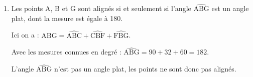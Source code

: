 \documentclass[12pt,a4paper,french]{article}
\begin{document}
\begin{enumerate}
	On peut donc calculer le cosinus de l'angle :\quad $\cos\left(\widehat{\mathrm{FBG}}\right) = \dfrac{\text{côté adjacent}}{\text{hypoténuse}} = \dfrac{\mathrm{BG}}{\mathrm{BF}} = \dfrac{2}{4} = \dfrac{1}{2}$.

	On a donc : \quad $\widehat{\mathrm{FBG}} = \arccos\left(\dfrac{1}{2}\right) = 60\degres$.

	\item Les points A, B et G sont alignés si et seulement si l'angle $\widehat{\mathrm{ABG}}$ est un angle plat, dont la mesure est égale à 180\degres.

	Ici on a : \quad $\widehat{\mathrm{ABG}} = \widehat{\mathrm{ABC}} + \widehat{\mathrm{CBF}}+\widehat{\mathrm{FBG}}$.

	Avec les mesures connues en degré : \quad $\widehat{\mathrm{ABG}} = 90 + 32 + 60 = 182$.

	L'angle $\widehat{\mathrm{ABG}}$ n'est pas un angle plat, les points ne sont donc pas alignés.
\end{enumerate}

\end{document}
